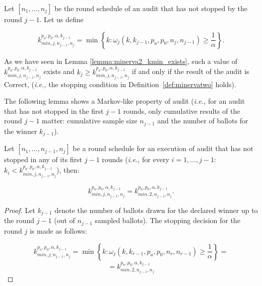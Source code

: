 \begin{definition} 
\label{def:kmin}
Let $[n_1, \ldots, n_j]$ be the round schedule of an audit that has not stopped by the round $j-1$. Let us define 
\begin{small}
\begin{equation}\label{eq:kMin}
k^{p_a, p_0, \alpha, k_{j-1}}_{min, j, n_{j-1}, n_j}  =
  \min\left\{k : \omega_j(k, k_{j-1},p_a,p_0,n_j, n_{j-1}) \geq \frac{1}{\alpha}  \right\}.
\end{equation}
\end{small}
\end{definition}
As we have seen in Lemma \ref{lemma:minerva2_kmin_exists}, such a value of $k^{p_a, p_0, \alpha, k_{j-1}}_{min, j, n_{j-1}, n_j}$ exists and $k_j \geq k^{p_a, p_0, \alpha, k_{j-1}}_{min, j, n_{j-1}, n_j} $ if and only if the result of the audit is Correct, (\textit{i.e.,} the stopping condition in Definition~\ref{def:minervatwo} holds).

The following lemma shows a Markov-like property of \Providence audit (\textit{i.e.,}
for an audit that has not stopped in the first $j-1$ rounds, only cumulative results of the round $j-1$ matter: cumulative sample size $n_{j-1}$ and the number of ballots for the winner $k_{j-1}$).

\begin{lemma}\label{lemma:markov}
Let $[n_1, \ldots, n_{j-1}, n_j]$ be a round schedule for an execution of  \Providence audit that has not stopped
in any of its first $j-1$ rounds (\textit{i.e.,} for every $i = 1, \ldots, j-1$:
$k_i < k^{p_a, p_0, \alpha, k_{j-1}}_{min, j, n_{j-1}, n_j} $), then: 

\[ 
k^{p_a, p_0, \alpha, k_{j-1}}_{min, j, n_{j-1}, n_j} = k^{p_a, p_0, \alpha, k_{j-1}}_{min, 2, n_{j-1}, n_j} .
\]
\end{lemma}
\begin{proof}
Let $k_{j-1}$ denote the number of ballots drawn for the declared winner up to the round $j-1$ (out of $n_{j-1}$ sampled ballots). The stopping decision for the round $j$ is made as follows:

\[
 k^{p_a, p_0, \alpha, k_{j-1}}_{min, j, n_{j-1}, n_j}  = \min\left\{k : \omega_{j}(k, k_{r-1}, p_a, p_0, n_r, n_{r-1}) \geq \frac{1}{\alpha}  \right\} = 
\]
\[
  =  k^{p_a, p_0, \alpha, k_{j-1}}_{min, 2, n_{j-1}, n_j}  
\]

\end{proof}

